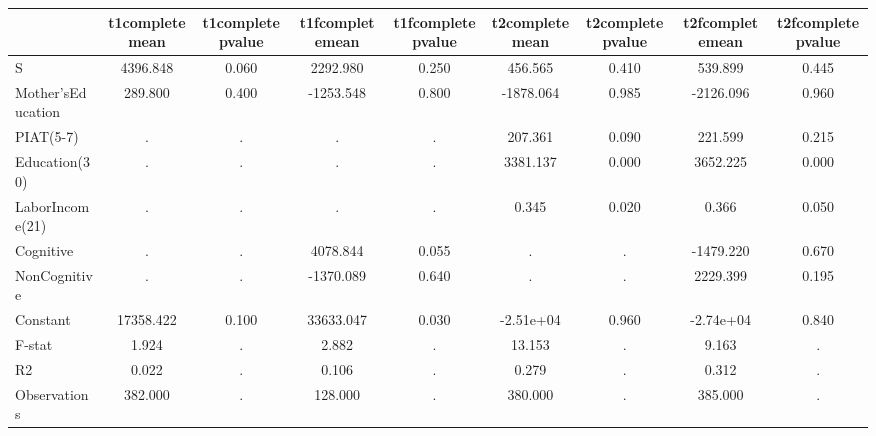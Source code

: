 \begin{table}[htbp]
\begin{tabular}{lcccccccc} \hline \hline
 & t1completemean  & t1completepvalue  & t1fcompletemean  & t1fcompletepvalue  & t2completemean  & t2completepvalue  & t2fcompletemean  & t2fcompletepvalue  \\  \hline 
S &  4396.848 &     0.060 &  2292.980 &     0.250 &   456.565 &     0.410 &   539.899 &     0.445 \\  
Mother'sEducation &   289.800 &     0.400 & -1253.548 &     0.800 & -1878.064 &     0.985 & -2126.096 &     0.960 \\  
PIAT(5-7) &         . &         . &         . &         . &   207.361 &     0.090 &   221.599 &     0.215 \\  
Education(30) &         . &         . &         . &         . &  3381.137 &     0.000 &  3652.225 &     0.000 \\  
LaborIncome(21) &         . &         . &         . &         . &     0.345 &     0.020 &     0.366 &     0.050 \\  
Cognitive &         . &         . &  4078.844 &     0.055 &         . &         . & -1479.220 &     0.670 \\  
NonCognitive &         . &         . & -1370.089 &     0.640 &         . &         . &  2229.399 &     0.195 \\  
Constant & 17358.422 &     0.100 & 33633.047 &     0.030 & -2.51e+04 &     0.960 & -2.74e+04 &     0.840 \\  
F-stat &     1.924 &         . &     2.882 &         . &    13.153 &         . &     9.163 &         . \\  
R2 &     0.022 &         . &     0.106 &         . &     0.279 &         . &     0.312 &         . \\  
Observations &   382.000 &         . &   128.000 &         . &   380.000 &         . &   385.000 &         . \\  
\hline \hline \end{tabular}
\end{table}
